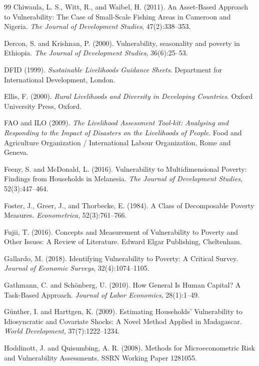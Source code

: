 \documentclass[11pt]{article}
\begin{document}
\begin{thebibliography}{99}
 Chiwaula, L. S., Witt, R., and Waibel, H. (2011). An Asset-Based Approach to Vulnerability: The Case of Small-Scale Fishing Areas in Cameroon and Nigeria. \textit{The Journal of Development Studies}, 47(2):338--353.

 Dercon, S. and Krishnan, P. (2000). Vulnerability, seasonality and poverty in Ethiopia. \textit{The Journal of Development Studies}, 36(6):25--53.

 DFID (1999). \textit{Sustainable Livelihoods Guidance Sheets}. Department for International Development, London.

 Ellis, F. (2000). \textit{Rural Livelihoods and Diversity in Developing Countries}. Oxford University Press, Oxford.

 FAO and ILO (2009). \textit{The Livelihood Assessment Tool-kit: Analysing and Responding to the Impact of Disasters on the Livelihoods of People}. Food and Agriculture Organization / International Labour Organization, Rome and Geneva.

 Feeny, S. and McDonald, L. (2016). Vulnerability to Multidimensional Poverty: Findings from Households in Melanesia. \textit{The Journal of Development Studies}, 52(3):447--464.

 Foster, J., Greer, J., and Thorbecke, E. (1984). A Class of Decomposable Poverty Measures. \textit{Econometrica}, 52(3):761--766.

 Fujii, T. (2016). Concepts and Measurement of Vulnerability to Poverty and Other Issues: A Review of Literature. Edward Elgar Publishing, Cheltenham.

 Gallardo, M. (2018). Identifying Vulnerability to Poverty: A Critical Survey. \textit{Journal of Economic Surveys}, 32(4):1074--1105.

 Gathmann, C. and Sch\"onberg, U. (2010). How General Is Human Capital? A Task-Based Approach. \textit{Journal of Labor Economics}, 28(1):1--49.

 G\"unther, I. and Harttgen, K. (2009). Estimating Households' Vulnerability to Idiosyncratic and Covariate Shocks: A Novel Method Applied in Madagascar. \textit{World Development}, 37(7):1222--1234.

 Hoddinott, J. and Quisumbing, A. R. (2008). Methods for Microeconometric Risk and Vulnerability Assessments. SSRN Working Paper 1281055.


\end{thebibliography}
\end{document}
